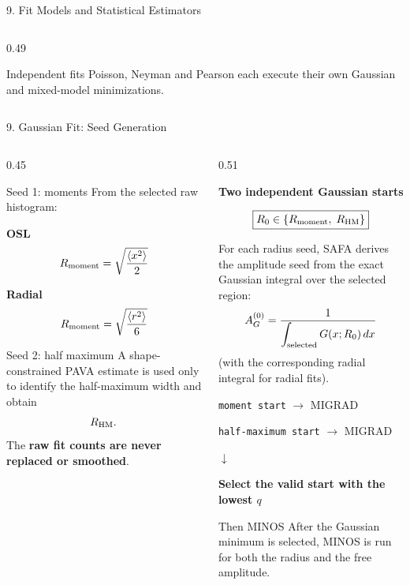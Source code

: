 \documentclass{beamer}
\begin{document}
\begin{frame}{9. Fit Models and Statistical Estimators}
\begin{columns}[T]
\begin{column}{0.49\textwidth}
\begin{alertblock}{Independent fits}
Poisson, Neyman and Pearson each execute their own Gaussian and mixed-model minimizations.
\end{alertblock}
\end{column}

\end{columns}
\end{frame}


\begin{frame}{9. Gaussian Fit: Seed Generation}
\fontsize{6.8}{7.6}\selectfont

\begin{columns}[T]

\begin{column}{0.45\textwidth}
\begin{block}{Seed 1: moments}
From the selected raw histogram:

\textbf{OSL}
\[
R_{\rm moment}=\sqrt{\frac{\langle x^2\rangle}{2}}
\]

\textbf{Radial}
\[
R_{\rm moment}=\sqrt{\frac{\langle r^2\rangle}{6}}
\]
\end{block}

\begin{block}{Seed 2: half maximum}
A shape-constrained PAVA estimate is used only to identify the half-maximum width and obtain
\[
R_{\rm HM}.
\]
The \textbf{raw fit counts are never replaced or smoothed}.
\end{block}
\end{column}

\begin{column}{0.51\textwidth}
\begin{center}
\textbf{Two independent Gaussian starts}
\end{center}
\vspace{-0.35em}
\[
\boxed{R_0\in\{R_{\rm moment},\;R_{\rm HM}\}}
\]

For each radius seed, SAFA derives the amplitude seed from the exact Gaussian integral over the selected region:
\[
A_G^{(0)}=
\frac{1}{\displaystyle\int_{\rm selected} G(x;R_0)\,dx}
\]
(with the corresponding radial integral for radial fits).

\begin{center}
\texttt{moment start}
$\longrightarrow$ MIGRAD

\smallskip
\texttt{half-maximum start}
$\longrightarrow$ MIGRAD

\smallskip
$\downarrow$

\textbf{Select the valid start with the lowest $q$}
\end{center}

\begin{alertblock}{Then MINOS}
After the Gaussian minimum is selected, MINOS is run for both the radius and the free amplitude.
\end{alertblock}
\end{column}

\end{columns}
\end{frame}
\end{document}
